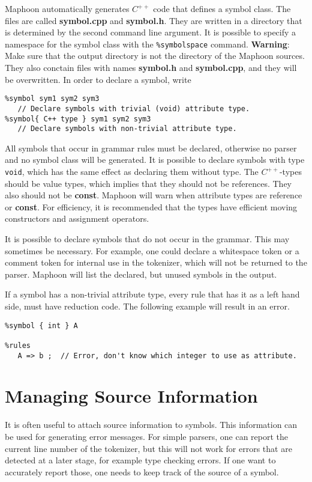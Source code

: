 \documentclass{article}
\begin{document}
Maphoon automatically generates $ C^{++} $ code that defines
a symbol class.
The files are called {\bf symbol.cpp} and {\bf symbol.h}.
They are written in a directory that is determined by the second command
line argument. It is possible to specify a namespace for the
symbol class with the \verb+%symbolspace+ command. 
{\bf Warning}: Make sure that the output directory is not the
directory of the Maphoon sources. 
They also conctain files with names
{\bf symbol.h} and {\bf symbol.cpp},
and they will be overwritten.
In order to declare a symbol, write
\begin{verbatim}
%symbol sym1 sym2 sym3  
   // Declare symbols with trivial (void) attribute type.
%symbol{ C++ type } sym1 sym2 sym3 
   // Declare symbols with non-trivial attribute type. 
\end{verbatim} 
All symbols that occur in grammar rules must be
declared, otherwise no parser and no symbol class will be generated.
It is possible to declare symbols with type \verb+void+,
which has the same effect as declaring them without type.
The $C^{++} $-types should be value types, which implies that they should
not be references. 
They also should not be
{\bf const}. Maphoon will warn when attribute types 
are reference or {\bf const}.
For efficiency, it is recommended that the
types have efficient moving constructors and assignment
operators. 

It is possible to declare symbols that do not occur
in the grammar. This may sometimes be necessary.
For example, one could declare a whitespace token  
or a comment token for internal use in the tokenizer,
which will not be returned to the parser.
Maphoon will list the declared, but unused symbols in the output.

If a symbol has a non-trivial attribute type, every rule that
has it as a left hand side, must have reduction code.
The following example will result in an error. 
\begin{verbatim}
%symbol { int } A

%rules
   A => b ;  // Error, don't know which integer to use as attribute.
\end{verbatim}

\section{Managing Source Information}

It is often useful to attach source information to symbols.
This information can be used for generating error messages. 
For simple parsers, one can report the current line number of
the tokenizer, but this will not work for errors that are detected
at a later stage, for example type checking errors. If one want to 
accurately report those, one needs to keep track of 
the source of a symbol. 
\end{document}

